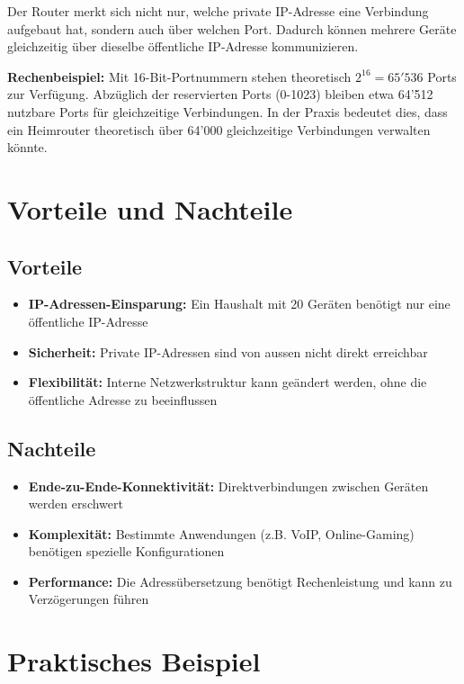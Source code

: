 \documentclass[
  nswissgerman,
  a4paper,
  DIV=11,
  numbers=noendperiod,
  ngerman]{scrreprt}
\providecommand{\tightlist}{%
  \setlength{\itemsep}{0pt}\setlength{\parskip}{0pt}}
\begin{document}
Der Router merkt sich nicht nur, welche private IP-Adresse eine
Verbindung aufgebaut hat, sondern auch über welchen Port. Dadurch können
mehrere Geräte gleichzeitig über dieselbe öffentliche IP-Adresse
kommunizieren.

\textbf{Rechenbeispiel:} Mit 16-Bit-Portnummern stehen theoretisch
\(2^{16} = 65'536\) Ports zur Verfügung. Abzüglich der reservierten
Ports (0-1023) bleiben etwa 64'512 nutzbare Ports für gleichzeitige
Verbindungen. In der Praxis bedeutet dies, dass ein Heimrouter
theoretisch über 64'000 gleichzeitige Verbindungen verwalten könnte.

\section{Vorteile und Nachteile}\label{vorteile-und-nachteile}

\subsection{Vorteile}\label{vorteile}

\begin{itemize}
\tightlist
\item
  \textbf{IP-Adressen-Einsparung:} Ein Haushalt mit 20 Geräten benötigt
  nur eine öffentliche IP-Adresse
\item
  \textbf{Sicherheit:} Private IP-Adressen sind von aussen nicht direkt
  erreichbar
\item
  \textbf{Flexibilität:} Interne Netzwerkstruktur kann geändert werden,
  ohne die öffentliche Adresse zu beeinflussen
\end{itemize}

\subsection{Nachteile}\label{nachteile}

\begin{itemize}
\tightlist
\item
  \textbf{Ende-zu-Ende-Konnektivität:} Direktverbindungen zwischen
  Geräten werden erschwert
\item
  \textbf{Komplexität:} Bestimmte Anwendungen (z.B. VoIP, Online-Gaming)
  benötigen spezielle Konfigurationen
\item
  \textbf{Performance:} Die Adressübersetzung benötigt Rechenleistung
  und kann zu Verzögerungen führen
\end{itemize}

\section{Praktisches Beispiel}\label{praktisches-beispiel}
\end{document}
